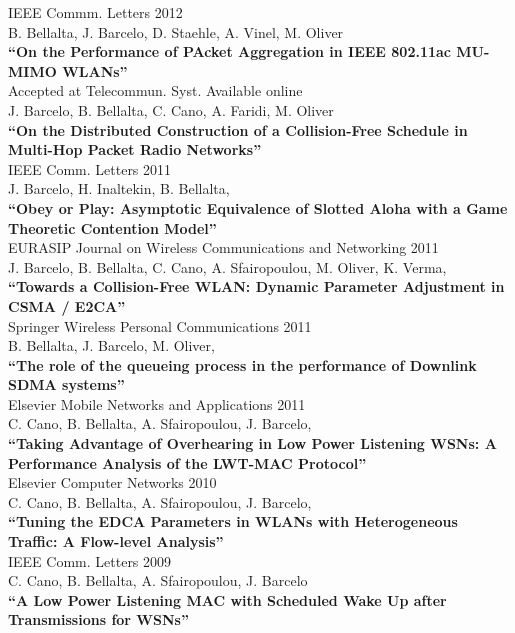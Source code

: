\documentclass[line,margin]{res}
\begin{document}
\begin{resume}
\hfill {IEEE Commm. Letters 2012} \\
B. Bellalta, J. Barcelo, D. Staehle, A. Vinel, M. Oliver\\
\textbf{``On the Performance of PAcket Aggregation in IEEE 802.11ac MU-MIMO WLANs''}\\

\hfill {Accepted at Telecommun. Syst. Available online} \\
J. Barcelo, B. Bellalta, C. Cano, A. Faridi, M. Oliver\\
\textbf{``On the Distributed Construction of a Collision-Free Schedule in Multi-Hop Packet Radio Networks''}\\

\hfill {IEEE Comm. Letters 2011} \\
J. Barcelo, H. Inaltekin, B. Bellalta,\\
\textbf{``Obey or Play: Asymptotic Equivalence of Slotted Aloha with a Game Theoretic Contention Model''}\\

\hfill {EURASIP Journal on Wireless Communications and Networking 2011} \\
J. Barcelo, B. Bellalta, C. Cano, A. Sfairopoulou, M. Oliver, K. Verma,\\
\textbf{``Towards a Collision-Free WLAN: Dynamic Parameter Adjustment in CSMA / E2CA''}\\

\hfill {Springer Wireless Personal Communications 2011} \\
B. Bellalta, J. Barcelo, M. Oliver,\\
\textbf{``The role of the queueing process in the performance of Downlink SDMA systems''}\\

\hfill {Elsevier Mobile Networks and Applications 2011} \\
C. Cano, B. Bellalta, A. Sfairopoulou, J. Barcelo,\\
\textbf{``Taking Advantage of Overhearing in Low Power Listening WSNs: A Performance Analysis of the LWT-MAC Protocol''}\\

\hfill {Elsevier Computer Networks 2010} \\
C. Cano, B. Bellalta, A. Sfairopoulou, J. Barcelo,\\
\textbf{``Tuning the EDCA Parameters in WLANs with Heterogeneous Traffic: A Flow-level Analysis''}\\

\hfill {IEEE Comm. Letters 2009} \\
C. Cano, B. Bellalta, A. Sfairopoulou, J. Barcelo\\
\textbf{``A Low Power Listening MAC with Scheduled Wake Up after Transmissions for WSNs''}\\


\end{resume}
\end{document}
